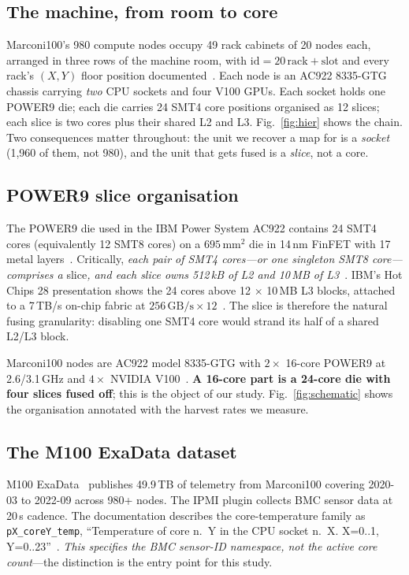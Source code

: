 \documentclass[10pt,conference]{IEEEtran}
\begin{document}
\subsection{The machine, from room to core}
Marconi100's 980 compute nodes occupy 49 rack cabinets of 20 nodes each, arranged in three rows of
the machine room, with $\mathrm{id}=20\,\mathrm{rack}+\mathrm{slot}$ and every rack's $(X,Y)$
floor position documented~\cite{exadata_repo}. Each node is an AC922 8335-GTG chassis carrying
\emph{two} CPU sockets and four V100 GPUs. Each socket holds one POWER9 die; each die carries 24
SMT4 core positions organised as 12 slices; each slice is two cores plus their shared L2 and L3.
Fig.~\ref{fig:hier} shows the chain. Two consequences matter throughout: the unit we recover a map
for is a \emph{socket} (1{,}960 of them, not 980), and the unit that gets fused is a \emph{slice},
not a core.

\subsection{POWER9 slice organisation}
The POWER9 die used in the IBM Power System AC922 contains 24 SMT4 cores (equivalently 12 SMT8
cores) on a $695\,\mathrm{mm}^2$ die in 14\,nm FinFET with 17 metal layers~\cite{wikichip_power9}.
Critically, \emph{each pair of SMT4 cores---or one singleton SMT8 core---comprises a}
slice\emph{, and each slice owns 512\,kB of L2 and 10\,MB of
L3}~\cite{wikichip_power9,thompto2016power9}. IBM's Hot Chips 28 presentation shows the 24 cores
above 12 $\times$ 10\,MB L3 blocks, attached to a 7\,TB/s on-chip fabric at
$256\,\mathrm{GB/s}\times12$~\cite{thompto2016power9}. The slice is therefore the natural fusing
granularity: disabling one SMT4 core would strand its half of a shared L2/L3 block.

Marconi100 nodes are AC922 model 8335-GTG with $2\times$ 16-core POWER9 at 2.6/3.1\,GHz and
$4\times$ NVIDIA V100~\cite{ibm_ac922,cineca_m100}. \textbf{A 16-core part is a 24-core die with
four slices fused off}; this is the object of our study. Fig.~\ref{fig:schematic} shows the
organisation annotated with the harvest rates we measure.

\subsection{The M100 ExaData dataset}
M100 ExaData~\cite{borghesi2023m100} publishes 49.9\,TB of telemetry from Marconi100 covering
2020-03 to 2022-09 across 980+ nodes. The IPMI plugin collects BMC sensor data at 20\,s cadence.
The documentation describes the core-temperature family as \texttt{pX\_coreY\_temp}, ``Temperature
of core n.\ Y in the CPU socket n.\ X. X=0..1, Y=0..23''~\cite{exadata_repo}. \emph{This specifies
the BMC sensor-ID namespace, not the active core count}---the distinction is the entry point for
this study.
\end{document}
